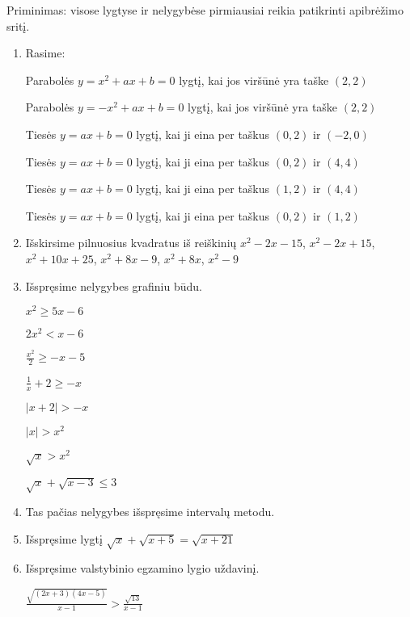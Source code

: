 \documentclass[12pt,a4paper]{report}
\numberwithin{table}{chapter}
\numberwithin{figure}{chapter}
\theoremstyle{definition}
\def\leq{\leqslant} \def\geq{\geqslant} \def\al{\alpha}
\begin{document}
Priminimas: visose lygtyse ir nelygybėse pirmiausiai reikia patikrinti apibrėžimo sritį.
\begin{enumerate}
\item Rasime:

Parabolės $y=x^2+ax+b=0$ lygtį, kai jos viršūnė yra taške $(2, 2)$

Parabolės $y=-x^2+ax+b=0$ lygtį, kai jos viršūnė yra taške $(2, 2)$

Tiesės $y=ax+b=0$ lygtį, kai ji eina per taškus $(0, 2)$ ir $(-2,0)$

Tiesės $y=ax+b=0$ lygtį, kai ji eina per taškus $(0, 2)$ ir $(4, 4)$

Tiesės $y=ax+b=0$ lygtį, kai ji eina per taškus $(1, 2)$ ir $(4, 4)$

Tiesės $y=ax+b=0$ lygtį, kai ji eina per taškus $(0, 2)$ ir $(1, 2)$

\item Išskirsime pilnuosius kvadratus iš reiškinių $x^2-2x-15$, $x^2-2x+15$, $x^2+10x+25$, $x^2+8x-9$, $x^2+8x$, $x^2-9$

\item Išspręsime nelygybes grafiniu būdu.

$x^2 \geq 5x-6$

$2x^2 < x-6$

$\frac{x^2}{2} \geq -x-5$

$\frac{1}{x}+2 \geq -x$

$|x+2|>-x$

$|x|>x^2$

$\sqrt{x}>x^2$

$\sqrt{x}+\sqrt{x-3} \leq 3$

\item Tas pačias nelygybes išspręsime intervalų metodu.

\item Išspręsime lygtį $\sqrt{x}+\sqrt{x+5} = \sqrt{x+21}$

\item Išspręsime valstybinio egzamino lygio uždavinį.

$\frac{\sqrt {(2x+3)(4x-5)}}{x-1}>\frac{\sqrt{13}}{x-1}$

\end{enumerate}
\end{document}

